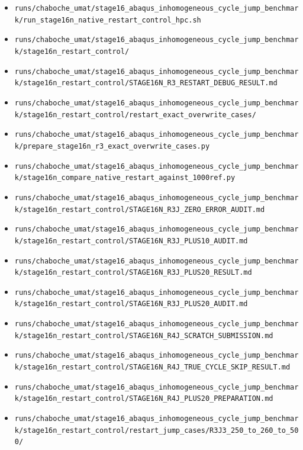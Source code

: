 \documentclass[11pt,a4paper]{article}
\newcommand{\code}[1]{\texttt{#1}}
\begin{document}
\begin{itemize}
  \item \code{runs/chaboche\_umat/stage16\_abaqus\_inhomogeneous\_cycle\_jump\_benchmark/run\_stage16n\_native\_restart\_control\_hpc.sh}
  \item \code{runs/chaboche\_umat/stage16\_abaqus\_inhomogeneous\_cycle\_jump\_benchmark/stage16n\_restart\_control/}
  \item \code{runs/chaboche\_umat/stage16\_abaqus\_inhomogeneous\_cycle\_jump\_benchmark/stage16n\_restart\_control/STAGE16N\_R3\_RESTART\_DEBUG\_RESULT.md}
  \item \code{runs/chaboche\_umat/stage16\_abaqus\_inhomogeneous\_cycle\_jump\_benchmark/stage16n\_restart\_control/restart\_exact\_overwrite\_cases/}
  \item \code{runs/chaboche\_umat/stage16\_abaqus\_inhomogeneous\_cycle\_jump\_benchmark/prepare\_stage16n\_r3\_exact\_overwrite\_cases.py}
  \item \code{runs/chaboche\_umat/stage16\_abaqus\_inhomogeneous\_cycle\_jump\_benchmark/stage16n\_compare\_native\_restart\_against\_1000ref.py}
  \item \code{runs/chaboche\_umat/stage16\_abaqus\_inhomogeneous\_cycle\_jump\_benchmark/stage16n\_restart\_control/STAGE16N\_R3J\_ZERO\_ERROR\_AUDIT.md}
  \item \code{runs/chaboche\_umat/stage16\_abaqus\_inhomogeneous\_cycle\_jump\_benchmark/stage16n\_restart\_control/STAGE16N\_R3J\_PLUS10\_AUDIT.md}
  \item \code{runs/chaboche\_umat/stage16\_abaqus\_inhomogeneous\_cycle\_jump\_benchmark/stage16n\_restart\_control/STAGE16N\_R3J\_PLUS20\_RESULT.md}
  \item \code{runs/chaboche\_umat/stage16\_abaqus\_inhomogeneous\_cycle\_jump\_benchmark/stage16n\_restart\_control/STAGE16N\_R3J\_PLUS20\_AUDIT.md}
  \item \code{runs/chaboche\_umat/stage16\_abaqus\_inhomogeneous\_cycle\_jump\_benchmark/stage16n\_restart\_control/STAGE16N\_R4J\_SCRATCH\_SUBMISSION.md}
  \item \code{runs/chaboche\_umat/stage16\_abaqus\_inhomogeneous\_cycle\_jump\_benchmark/stage16n\_restart\_control/STAGE16N\_R4J\_TRUE\_CYCLE\_SKIP\_RESULT.md}
  \item \code{runs/chaboche\_umat/stage16\_abaqus\_inhomogeneous\_cycle\_jump\_benchmark/stage16n\_restart\_control/STAGE16N\_R4J\_PLUS20\_PREPARATION.md}
  \item \code{runs/chaboche\_umat/stage16\_abaqus\_inhomogeneous\_cycle\_jump\_benchmark/stage16n\_restart\_control/restart\_jump\_cases/R3J3\_250\_to\_260\_to\_500/}

\end{itemize}
\end{document}
